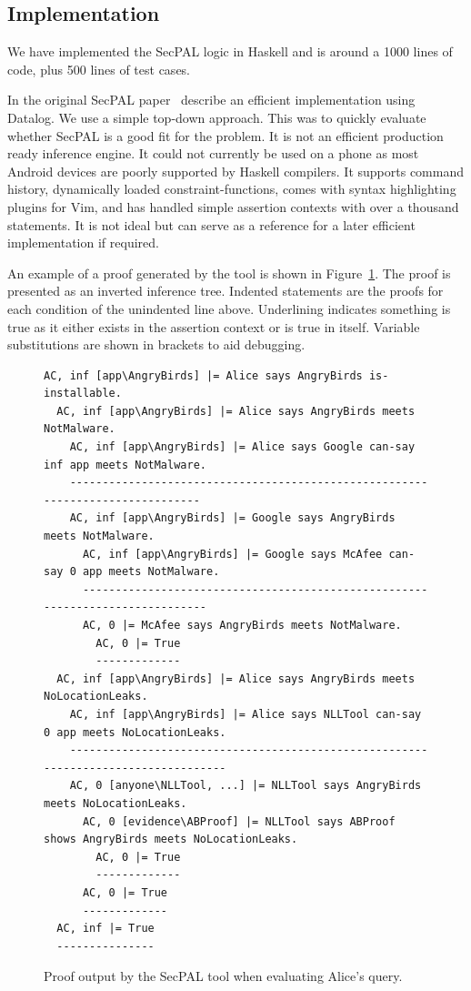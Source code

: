 \documentclass[a4paper]{article}
\begin{document}
\subsection{Implementation}

We have implemented the SecPAL logic in Haskell and is around a
1000 lines of code, plus 500 lines of test cases.

In the original SecPAL paper~\cite{Becker:2006vh}
\citeauthor*{Becker:2006vh} describe an efficient implementation using Datalog.
We use a simple top-down approach.
This was to quickly evaluate whether SecPAL is a good fit for
the problem. It is not an efficient production ready inference
engine.  It could not currently be used on a phone as most Android devices
 are poorly supported by Haskell compilers.
It supports command history, dynamically loaded constraint-functions,
comes with syntax highlighting plugins for Vim, and has handled simple assertion
contexts with over a thousand statements. It is not ideal but can serve as
a reference for a later efficient implementation if required.

An example of a proof generated by the tool is shown in
Figure~\ref{secpal:exampleproof}.  The proof is presented as an inverted
inference tree. Indented statements are the proofs for each condition of
the unindented line above.  Underlining indicates something is  true
as it either exists in the assertion context or is true in itself. Variable
substitutions are shown in brackets to aid debugging.

\begin{figure}
  \begin{lstlisting}[basicstyle=\small\ttfamily,columns=flexible,mathescape]
AC, inf [app\AngryBirds] |= Alice says AngryBirds is-installable.
  AC, inf [app\AngryBirds] |= Alice says AngryBirds meets NotMalware.
    AC, inf [app\AngryBirds] |= Alice says Google can-say inf app meets NotMalware.
    -------------------------------------------------------------------------------
    AC, inf [app\AngryBirds] |= Google says AngryBirds meets NotMalware.
      AC, inf [app\AngryBirds] |= Google says McAfee can-say 0 app meets NotMalware.
      ------------------------------------------------------------------------------
      AC, 0 |= McAfee says AngryBirds meets NotMalware.
        AC, 0 |= True
        -------------
  AC, inf [app\AngryBirds] |= Alice says AngryBirds meets NoLocationLeaks.
    AC, inf [app\AngryBirds] |= Alice says NLLTool can-say 0 app meets NoLocationLeaks.
    -----------------------------------------------------------------------------------
    AC, 0 [anyone\NLLTool, ...] |= NLLTool says AngryBirds meets NoLocationLeaks.
      AC, 0 [evidence\ABProof] |= NLLTool says ABProof shows AngryBirds meets NoLocationLeaks.
        AC, 0 |= True
        -------------
      AC, 0 |= True
      -------------
  AC, inf |= True
  ---------------
  \end{lstlisting}
  \caption{Proof output by the SecPAL tool when evaluating Alice's query.}
\label{secpal:exampleproof}
\end{figure}
\end{document}
